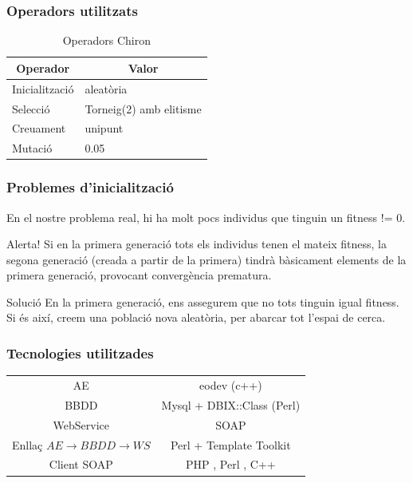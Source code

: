 \documentclass{beamer}
\begin{document}
\begin{frame}
\frametitle{Operadors utilitzats}


\begin{table}
\centering
\begin{tabular}{|l|l|}
\hline
\multicolumn{1}{|c|}{\textbf{Operador }} & \multicolumn{1}{c|}{\textbf{ Valor}} \\
\hline
\hline
Inicialització & aleatòria \\
Selecció       &  Torneig(2) amb elitisme       \\
Creuament       & unipunt  \\
Mutació        & 0.05        \\
\hline
\end{tabular}
\caption{Operadors Chiron}
\end{table}
\end{frame}

\begin{frame}
\frametitle{Problemes d'inicialització}
En el nostre problema real, hi ha molt pocs individus que tinguin un fitness !=
0.
\pause
\begin{alertblock}{Alerta!}
Si en la primera generació tots els individus tenen el mateix fitness, la segona
generació (creada a partir de la primera) tindrà bàsicament elements de la
primera generació, provocant convergència prematura.
\end{alertblock}
\pause
\begin{exampleblock}{Solució}
En la primera generació, ens assegurem que no tots tinguin igual fitness.  Si és
així, creem una població nova aleatòria, per abarcar tot l'espai de cerca.
\end{exampleblock}
\end{frame}

\begin{frame}
\frametitle{Tecnologies utilitzades}
\begin{tabular}[h!]{|c|c|}
AE & eodev (c++) \\
BBDD & Mysql + DBIX::Class (Perl) \\
WebService & SOAP \\
Enllaç $AE\rightarrow BBDD\rightarrow WS$ & Perl + Template Toolkit\\
Client SOAP & PHP , Perl , C++ \\
\end{tabular}
\end{frame}
\end{document}
